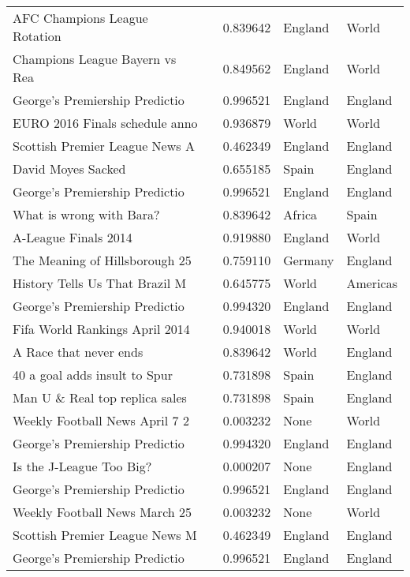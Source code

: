 \begin{table}[h]
\begin{tabular}{l|l|l|l|l}
AFC Champions League Rotation   &        & 0.839642 & England & World    \\
Champions League Bayern vs Rea  &        & 0.849562 & England & World    \\
George's Premiership Predictio  &        & 0.996521 & England & England  \\
EURO 2016 Finals schedule anno  &        & 0.936879 & World   & World    \\
Scottish Premier League News A  &        & 0.462349 & England & England  \\
David Moyes Sacked              &        & 0.655185 & Spain   & England  \\
George's Premiership Predictio  &        & 0.996521 & England & England  \\
What is wrong with Bara?        &        & 0.839642 & Africa  & Spain    \\
A-League Finals 2014            &        & 0.919880 & England & World    \\
The Meaning of Hillsborough 25  &        & 0.759110 & Germany & England  \\
History Tells Us That Brazil M  &        & 0.645775 & World   & Americas \\
George's Premiership Predictio  &        & 0.994320 & England & England  \\
Fifa World Rankings April 2014  &        & 0.940018 & World   & World    \\
A Race that never ends          &        & 0.839642 & World   & England  \\
40 a goal adds insult to Spur   &        & 0.731898 & Spain   & England  \\
Man U \& Real top replica sales &        & 0.731898 & Spain   & England  \\
Weekly Football News April 7 2  &        & 0.003232 & None    & World    \\
George's Premiership Predictio  &        & 0.994320 & England & England  \\
Is the J-League Too Big?        &        & 0.000207 & None    & England  \\
George's Premiership Predictio  &        & 0.996521 & England & England  \\
Weekly Football News March 25   &        & 0.003232 & None    & World    \\
Scottish Premier League News M  &        & 0.462349 & England & England  \\
George's Premiership Predictio  &        & 0.996521 & England & England  \\

\end{tabular}
\end{table}
